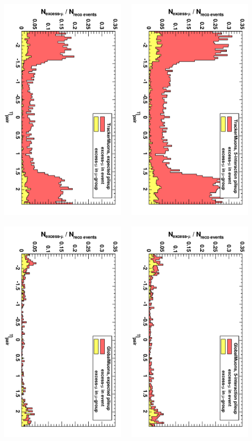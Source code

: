 \documentclass[compress]{beamer}
\begin{document}
\begin{frame}
\begin{columns}
\mbox{\includegraphics[height=0.5\linewidth, angle=90]{toomanymuons_TrackerMuonsGroupByMassAndVertexProbOrDeltaR_pileup.pdf}
\includegraphics[height=0.5\linewidth, angle=90]{toomanymuons_GlobalMuonsGroupByMassAndVertexProbOrDeltaR_pileup.pdf}}

\mbox{\includegraphics[height=0.5\linewidth, angle=90]{toomanymuons_TrackerMuonsGroupByMassAndVertexProbOrDeltaR_pileup5.pdf}
\includegraphics[height=0.5\linewidth, angle=90]{toomanymuons_GlobalMuonsGroupByMassAndVertexProbOrDeltaR_pileup5.pdf}}


\end{columns}
\end{frame}
\end{document}
